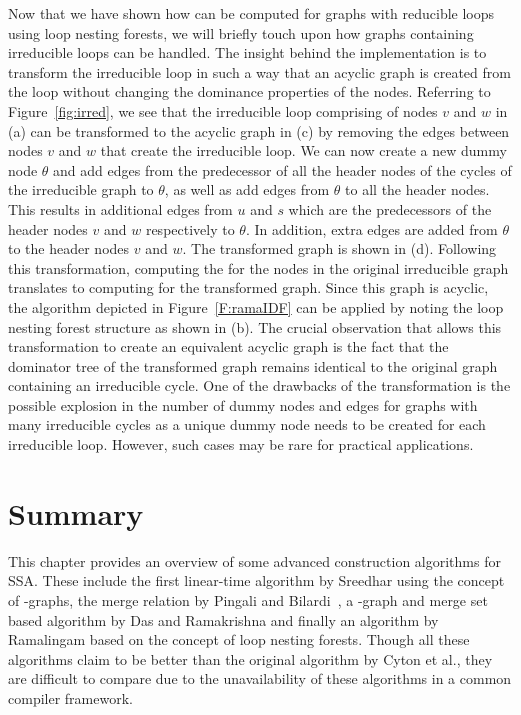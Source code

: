 {    Now that we have shown how \iDF can be computed for graphs with reducible loops using 
    loop nesting forests, we will briefly touch
    upon how graphs containing irreducible loops can be handled. The insight behind the implementation
    is to transform the irreducible loop in such a way that an acyclic graph is created from the loop
    without changing the dominance properties of the nodes. Referring to Figure~\ref{fig:irred}, we see 
    that the irreducible loop comprising of nodes $v$ and $w$ in (a) can be transformed to the acyclic
    graph in (c) by removing the edges between nodes $v$ and $w$ that create the irreducible loop. 
    We can now create a new dummy node $\theta$ and add edges from the predecessor of all
    the header nodes of the cycles of the irreducible graph to $\theta$, 
    as well as add edges from $\theta$ to all the 
    header nodes. This results in additional edges from $u$ and $s$ which are the predecessors of the
    header nodes $v$ and $w$ respectively to $\theta$. In addition, extra edges are added from $\theta$
    to the header nodes $v$ and $w$. The transformed graph is shown in (d). Following this transformation, 
    computing the \iDF for the nodes 
    in the original irreducible graph translates to computing \iDF for the transformed graph. Since this
    graph is acyclic, the algorithm depicted in Figure~\ref{F:ramaIDF} can be applied by noting the
    loop nesting forest structure as shown in (b). The crucial observation that allows this transformation 
    to create an equivalent acyclic
    graph is the fact that the dominator tree of the transformed graph remains identical to the
    original graph containing an irreducible cycle. One of the drawbacks of the transformation is the
    possible explosion in the number of dummy nodes and edges for graphs with many irreducible cycles as
    a unique dummy node needs to be created for each irreducible loop. However, such cases may be rare
    for practical applications.

    \section{Summary}
    This chapter provides an overview of some advanced construction algorithms 
    for SSA. These include the first  linear-time algorithm by Sreedhar using 
    the concept of \DJ-graphs, the merge relation by Pingali and 
    Bilardi~\cite{bilardi}, a \DJ-graph and merge set based algorithm by Das and Ramakrishna and finally an algorithm by Ramalingam based on the concept of loop nesting forests. Though all these algorithms claim to be better than the original algorithm by Cyton et al., they are difficult to compare due to the unavailability of these algorithms in a common compiler framework. 

}
